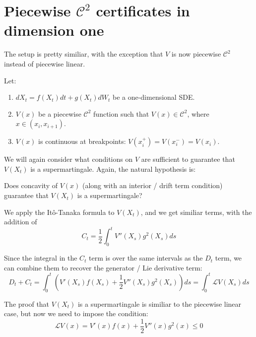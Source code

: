 \section{Piecewise $\mathcal{C}^2$ certificates in dimension one}

The setup is pretty similiar, with the exception that $V$ is now piecewise $\mathcal{C}^2$ instead of piecewise linear. 

\begin{setup}
Let:
\begin{enumerate}
    \item $dX_t = f(X_t) dt + g(X_t) dW_t$ be a one-dimensional SDE.
    \item $V(x)$ be a piecewise $\mathcal{C}^2$ function such that $V(x) \in \mathcal{C}^2$, where $x \in \left( x_i, x_{i+1} \right)$.
    \item $V(x)$ is continuous at breakpoints: $V(x_i^+)=V(x_i^-) = V(x_i)$.
\end{enumerate}

\end{setup}

We will again consider what conditions on $V$ are sufficient to guarantee that $V(X_t)$ is a supermartingale. Again, the natural hypothesis is:

\begin{hypothesis}
Does concavity of $V(x)$ (along with an interior / drift term condition) guarantee that $V(X_t)$ is a supermartingale?
\end{hypothesis}

We apply the Itô-Tanaka formula to $V(X_t)$, and we get similiar terms, with the addition of
\begin{equation}
  C_t = \frac{1}{2} \int_{0}^{t} V''(X_s) g^2(X_s) ds
\end{equation}

Since the integral in the $C_t$ term is over the same intervals as the $D_t$ term, we can combine them to recover the generator / Lie derivative term:
\begin{equation}
  D_t + C_t = \int_{0}^{t} \left( V'(X_s) f(X_s) + \frac{1}{2} V''(X_s) g^2(X_s) \right) ds = \int_{0}^{t} \mathcal{L} V(X_s) ds
\end{equation}

The proof that $V(X_t)$ is a supermartingale is similiar to the piecewise linear case, but now we need to impose the condition:
\begin{equation}
  \mathcal{L} V(x) = V'(x) f(x) + \frac{1}{2} V''(x) g^2(x) \leq 0
\end{equation}

\newpage

